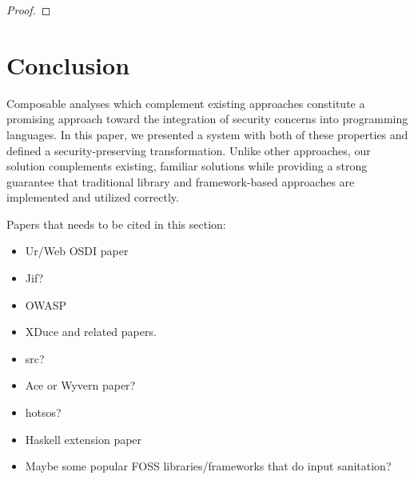 \documentclass{acm_proc_article-sp}
\theoremstyle{definition}
\newcommand{\Lagr}{\mathcal{L}}
\newcommand{\lang}[1]{\Lagr\{#1\}}
\newcommand{\rcoerce}[2]{{\sf rcoerce}[#1](#2)}
\newcommand{\stringin}[1]{{\sf stringin}[#1]}
\newcommand{\rx}[1]{ {\sf rx}[#1] }
\newcommand{\str}{{\sf string}}
\newcommand{\err}{\ {\sf err}}
\newcommand{\trden}[1]{\llbracket #1 \rrbracket} %
\newcommand{\treduces}{ \Downarrow }
\newcommand{\sreduces}{ \Downarrow }
\begin{document}
\begin{proof}
%
%
%
%
%
\end{proof}


\section{Conclusion}

Composable analyses which complement existing approaches constitute a promising approach toward the integration of security concerns into programming languages.
In this paper, we presented a system with both of these properties and defined a security-preserving transformation.
Unlike other approaches, our solution complements existing, familiar solutions while providing a strong guarantee that traditional library and framework-based approaches are implemented and utilized correctly.


Papers that needs to be cited in this section:
\begin{itemize}
  \item Ur/Web OSDI paper
  \item Jif?
  \item OWASP
  \item XDuce and related papers. 
  \item src?
  \item Ace or Wyvern paper?
  \item hotsos?
  \item Haskell extension paper
  \item Maybe some popular FOSS libraries/frameworks that do input sanitation?
\end{itemize}
\end{document}
